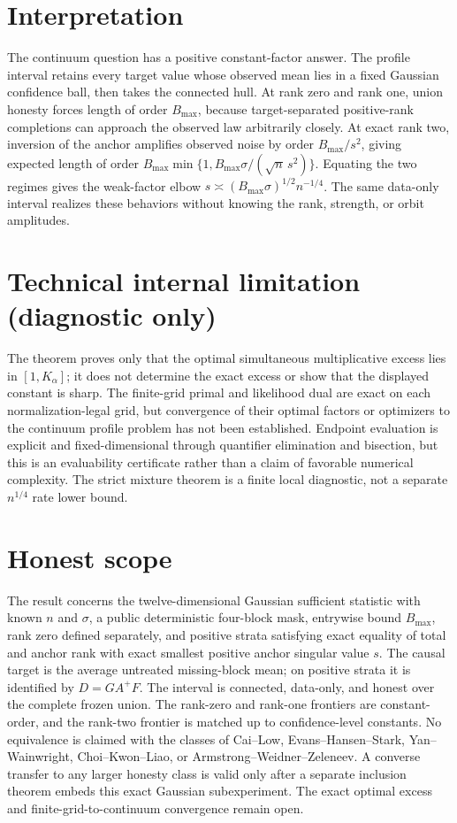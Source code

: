 \documentclass{article}
\begin{document}
\section{Interpretation}

The continuum question has a positive constant-factor answer. The profile interval retains every target value whose observed mean lies in a fixed Gaussian confidence ball, then takes the connected hull. At rank zero and rank one, union honesty forces length of order \(B_{\max}\), because target-separated positive-rank completions can approach the observed law arbitrarily closely. At exact rank two, inversion of the anchor amplifies observed noise by order \(B_{\max}/s^2\), giving expected length of order \(B_{\max}\min\{1,B_{\max}\sigma/(\sqrt n\,s^2)\}\). Equating the two regimes gives the weak-factor elbow \(s\asymp(B_{\max}\sigma)^{1/2}n^{-1/4}\). The same data-only interval realizes these behaviors without knowing the rank, strength, or orbit amplitudes.

\section*{Technical internal limitation (diagnostic only)}

The theorem proves only that the optimal simultaneous multiplicative excess lies in \([1,K_\alpha]\); it does not determine the exact excess or show that the displayed constant is sharp. The finite-grid primal and likelihood dual are exact on each normalization-legal grid, but convergence of their optimal factors or optimizers to the continuum profile problem has not been established. Endpoint evaluation is explicit and fixed-dimensional through quantifier elimination and bisection, but this is an evaluability certificate rather than a claim of favorable numerical complexity. The strict mixture theorem is a finite local diagnostic, not a separate \(n^{1/4}\) rate lower bound.

\section{Honest scope}

The result concerns the twelve-dimensional Gaussian sufficient statistic with known \(n\) and \(\sigma\), a public deterministic four-block mask, entrywise bound \(B_{\max}\), rank zero defined separately, and positive strata satisfying exact equality of total and anchor rank with exact smallest positive anchor singular value \(s\). The causal target is the average untreated missing-block mean; on positive strata it is identified by \(D=GA^+F\). The interval is connected, data-only, and honest over the complete frozen union. The rank-zero and rank-one frontiers are constant-order, and the rank-two frontier is matched up to confidence-level constants. No equivalence is claimed with the classes of Cai--Low, Evans--Hansen--Stark, Yan--Wainwright, Choi--Kwon--Liao, or Armstrong--Weidner--Zeleneev. A converse transfer to any larger honesty class is valid only after a separate inclusion theorem embeds this exact Gaussian subexperiment. The exact optimal excess and finite-grid-to-continuum convergence remain open.
\end{document}
